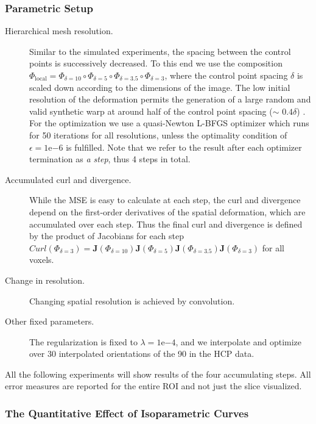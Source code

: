 \documentclass[twocolumn]{svjour3}
\begin{document}
\subsubsection{Parametric Setup}

\begin{description}
\item[Hierarchical mesh resolution.] Similar to the simulated experiments, the spacing
  between the control points is successively decreased. To this end we use the composition
  $\Phi_{\text{local}} = \Phi_{\delta=10} \circ \Phi_{\delta=5} \circ \Phi_{\delta=3.5}
  \circ \Phi_{\delta=3}$, where the control point spacing $\delta$ is scaled down
  according to the dimensions of the image. The low initial resolution of the deformation
  permits the generation of a large random and valid synthetic warp at around half of the
  control point spacing ($\sim$ $0.4\delta$) \cite{rueckert2006diffeomorphic}. For the
  optimization we use a quasi-Newton L-BFGS optimizer which runs for 50 iterations for all
  resolutions, unless the optimality condition of $\epsilon = 1\mathrm{e}{-6}$ is
  fulfilled. Note that we refer to the result after each optimizer termination as
  \textit{a step}, thus 4 steps in total.
\item[Accumulated curl and divergence.] While the MSE is easy to calculate at each step,
  the curl and divergence depend on the first-order derivatives of the spatial
  deformation, which are accumulated over each step. Thus the final curl and divergence is
  defined by the product of Jacobians for each step
  $Curl(\Phi_{\delta=3}) = \bm J(\Phi_{\delta=10})\bm J(\Phi_{\delta=5})\bm
  J(\Phi_{\delta=3.5})\bm J(\Phi_{\delta=3})$ for all voxels.
\item[Change in resolution.] Changing spatial resolution is achieved by convolution.
\item[Other fixed parameters.] The regularization is fixed to $\lambda=1\mathrm{e}{-4}$,
  and we interpolate and optimize over 30 interpolated orientations of the 90 in the HCP
  data.
\end{description}
All the following experiments will show results of the four accumulating steps. All error
measures are reported for the entire ROI and not just the slice visualized.

\subsubsection{The Quantitative Effect of Isoparametric Curves}
\label{subsec:isocurvesparam}
\end{document}
